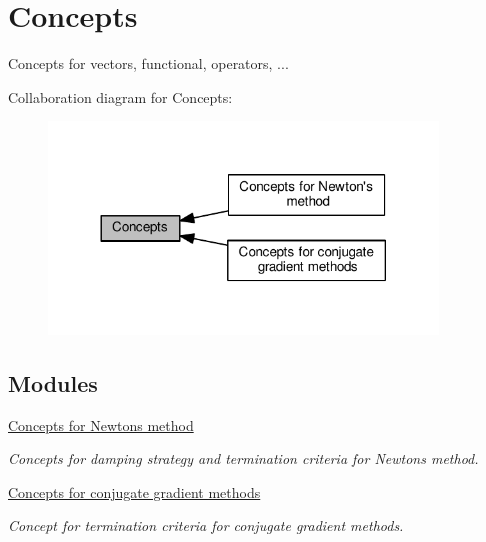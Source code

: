 \hypertarget{group__ConceptGroup}{}\section{Concepts}
\label{group__ConceptGroup}


Concepts for vectors, functional, operators, ...  


Collaboration diagram for Concepts\+:\nopagebreak
\begin{figure}[H]
\begin{center}
\leavevmode
\includegraphics[width=293pt]{group__ConceptGroup}
\end{center}
\end{figure}
\subsection*{Modules}
\begin{DoxyCompactItemize}
\item 
\hyperlink{group__NewtonConceptGroup}{Concepts for Newton\textquotesingle{}s method}
\begin{DoxyCompactList}\small\item\em Concepts for damping strategy and termination criteria for Newton\textquotesingle{}s method. \end{DoxyCompactList}\item 
\hyperlink{group__CGConceptGroup}{Concepts for conjugate gradient methods}
\begin{DoxyCompactList}\small\item\em Concept for termination criteria for conjugate gradient methods. \end{DoxyCompactList}\end{DoxyCompactItemize}
